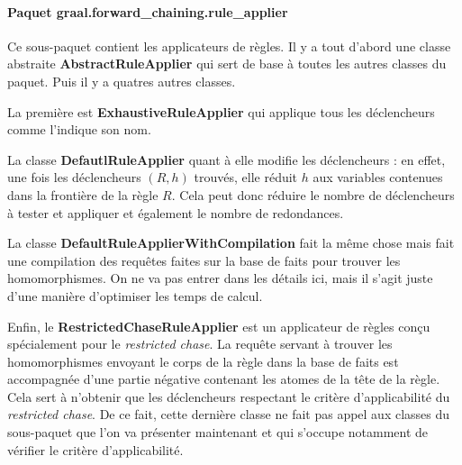          \paragraph{Paquet graal.forward\_chaining.rule\_applier} Ce sous-paquet contient les applicateurs de règles. Il y a tout d'abord une classe abstraite \textbf{AbstractRuleApplier} qui sert de base à toutes les autres classes du paquet. Puis il y a quatres autres classes.
         \par La première est \textbf{ExhaustiveRuleApplier} qui applique tous les déclencheurs comme l'indique son nom. 
         \par La classe \textbf{DefautlRuleApplier} quant à elle modifie les déclencheurs : en effet, une fois les déclencheurs $(R,h)$ trouvés, elle réduit $h$ aux variables contenues dans la frontière de la règle $R$. Cela peut donc réduire le nombre de déclencheurs à tester et appliquer et également le nombre de redondances. 
         \par La classe \textbf{DefaultRuleApplierWithCompilation} fait la même chose mais fait une compilation des requêtes faites sur la base de faits pour trouver les homomorphismes. On ne va pas entrer dans les détails ici, mais il s'agit juste d'une manière d'optimiser les temps de calcul. 
         \par Enfin, le \textbf{RestrictedChaseRuleApplier} est un applicateur de règles conçu spécialement pour le \textit{restricted chase}. La requête servant à trouver les homomorphismes envoyant le corps de la règle dans la base de faits est accompagnée d'une partie négative contenant les atomes de la tête de la règle. Cela sert à n'obtenir que les déclencheurs respectant le critère d'applicabilité du \textit{restricted chase}. De ce fait, cette dernière classe ne fait pas appel aux classes du sous-paquet que l'on va présenter maintenant et qui s'occupe notamment de vérifier le critère d'applicabilité.
         

